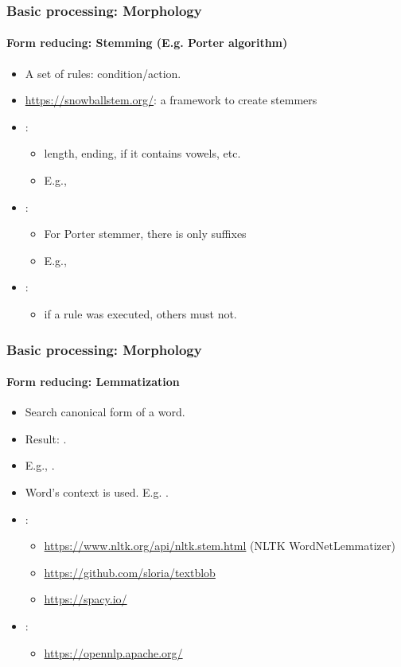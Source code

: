 \documentclass[xcolor=table]{beamer}
\begin{document}
\begin{frame}
\frametitle{Basic processing: Morphology}
\framesubtitle{Form reducing: Stemming (E.g. Porter algorithm)}

\begin{itemize}
	\item A set of rules: condition/action.
	\item \url{https://snowballstem.org/}: a framework to create stemmers
	\item {}:
	\begin{itemize}
		\item length, ending, if it contains vowels, etc.
		\item E.g., 
	\end{itemize}
	\item {}:
	\begin{itemize}
		\item For Porter stemmer, there is only suffixes 
		\item E.g., 
	\end{itemize}
	\item {}:
	\begin{itemize}
		\item if a rule was executed, others must not.
	\end{itemize}
\end{itemize}

\end{frame}

\begin{frame}
\frametitle{Basic processing: Morphology}
\framesubtitle{Form reducing: Lemmatization}

\begin{itemize}
	\item Search canonical form of a word.
	\item Result: .
	\item E.g., .
	\item Word's context is used. E.g. .
	\item {}:
	\begin{itemize}
		\item \url{https://www.nltk.org/api/nltk.stem.html} (NLTK WordNetLemmatizer)
		\item \url{https://github.com/sloria/textblob}
		\item \url{https://spacy.io/}
	\end{itemize}
	\item {}:
	\begin{itemize}
		\item \url{https://opennlp.apache.org/}
	\end{itemize}
\end{itemize}

\end{frame}
\end{document}
